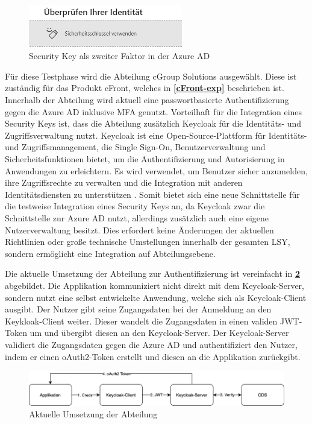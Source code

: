 \begin{figure}[h]
	\centering 
	\includegraphics[width=0.6\textwidth]{img/abbildungen/azure_seckey.png}
	\captionsetup{format=hang}
	\caption{Security Key als zweiter Faktor in der Azure \ac{AD}} \label{azure-seckey}
\end{figure}

Für diese Testphase wird die Abteilung cGroup Solutions ausgewählt. Diese ist zuständig für das Produkt cFront, welches in \textbf{\ref{cFront-exp}} beschrieben ist. Innerhalb der Abteilung wird aktuell eine passwortbasierte Authentifizierung gegen die Azure \ac{AD} inklusive \ac{MFA} genutzt. Vorteilhaft für die Integration eines Security Keys ist, dass die Abteilung zusätzlich Keycloak für die Identitäts- und Zugriffsverwaltung nutzt. Keycloak ist eine Open-Source-Plattform für Identitäts- und Zugriffsmanagement, die Single Sign-On, Benutzerverwaltung und Sicherheitsfunktionen bietet, um die Authentifizierung und Autorisierung in Anwendungen zu erleichtern. Es wird verwendet, um Benutzer sicher anzumelden, ihre Zugriffsrechte zu verwalten und die Integration mit anderen Identitätsdiensten zu unterstützen \cite{keycloak}. Somit bietet sich eine neue Schnittstelle für die testweise Integration eines Security Keys an, da Keycloak zwar die Schnittstelle zur Azure \ac{AD} nutzt, allerdings zusätzlich auch eine eigene Nutzerverwaltung besitzt. Dies erfordert keine Änderungen der aktuellen Richtlinien oder große technische Umstellungen innerhalb der gesamten \ac{LSY}, sondern ermöglicht eine Integration auf Abteilungsebene.

Die aktuelle Umsetzung der Abteilung zur Authentifizierung ist vereinfacht in \textbf{\ref{current-imp}} abgebildet. Die Applikation kommuniziert nicht direkt mit dem Keycloak-Server, sondern nutzt eine selbst entwickelte Anwendung, welche sich als Keycloak-Client ausgibt. Der Nutzer gibt seine Zugangsdaten bei der Anmeldung an den Keykloak-Client weiter. Dieser wandelt die Zugangsdaten in einen validen JWT-Token um und übergibt diesen an den Keycloak-Server. Der Keycloak-Server validiert die Zugangsdaten gegen die Azure \ac{AD} und authentifiziert den Nutzer, indem er einen oAuth2-Token erstellt und diesen an die Applikation zurückgibt.


\begin{figure}[h]
	\centering 
	\includegraphics[width=1\textwidth]{img/abbildungen/Unknown.png}
	\captionsetup{format=hang}
	\caption{Aktuelle Umsetzung der Abteilung} \label{current-imp}
\end{figure}

